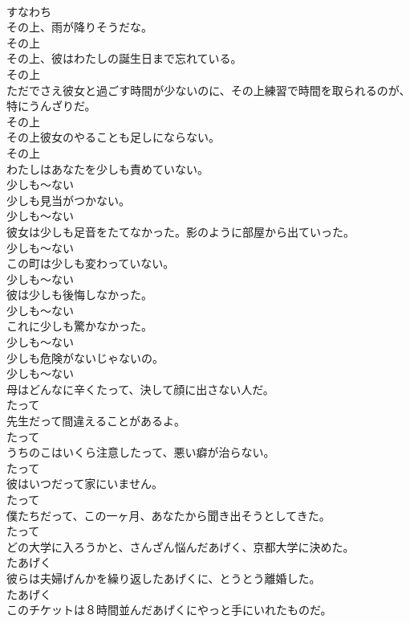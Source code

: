 \documentclass[8pt]{extreport}
\begin{document}
\begin{CJK}{UTF8}{min}
\\	すなわち
\\	その上、雨が降りそうだな。	
\\	その上
\\	その上、彼はわたしの誕生日まで忘れている。	
\\	その上
\\	ただでさえ彼女と過ごす時間が少ないのに、その上練習で時間を取られるのが、特にうんざりだ。	
\\	その上
\\	その上彼女のやることも足しにならない。	
\\	その上
\\	わたしはあなたを少しも責めていない。	
\\	少しも～ない
\\	少しも見当がつかない。	
\\	少しも～ない
\\	彼女は少しも足音をたてなかった。影のように部屋から出ていった。	
\\	少しも～ない
\\	この町は少しも変わっていない。	
\\	少しも～ない
\\	彼は少しも後悔しなかった。	
\\	少しも～ない
\\	これに少しも驚かなかった。	
\\	少しも～ない
\\	少しも危険がないじゃないの。	
\\	少しも～ない
\\	母はどんなに辛くたって、決して顔に出さない人だ。	
\\	たって
\\	先生だって間違えることがあるよ。	
\\	たって
\\	うちのこはいくら注意したって、悪い癖が治らない。	
\\	たって
\\	彼はいつだって家にいません。	
\\	たって
\\	僕たちだって、この一ヶ月、あなたから聞き出そうとしてきた。	
\\	たって
\\	どの大学に入ろうかと、さんざん悩んだあげく、京都大学に決めた。	
\\	たあげく
\\	彼らは夫婦げんかを繰り返したあげくに、とうとう離婚した。	
\\	たあげく
\\	このチケットは８時間並んだあげくにやっと手にいれたものだ。	

\end{CJK}
\end{document}
